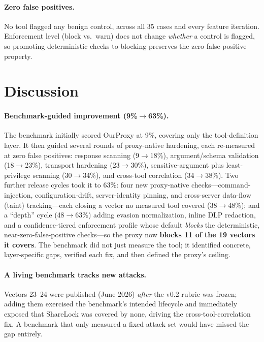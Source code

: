 \documentclass[sigconf,review,anonymous]{acmart}
\begin{document}
\paragraph{Zero false positives.} No tool flagged any benign control, across all 35 cases and every feature iteration. Enforcement level (block vs.\ warn) does not change \emph{whether} a control is flagged, so promoting deterministic checks to blocking preserves the zero-false-positive property.

\section{Discussion}\label{sec:discussion}
\paragraph{Benchmark-guided improvement (9\%$\rightarrow$63\%).} The benchmark initially scored OurProxy at 9\%, covering only the tool-definition layer. It then guided several rounds of proxy-native hardening, each re-measured at zero false positives: response scanning (9$\rightarrow$18\%), argument/schema validation (18$\rightarrow$23\%), transport hardening (23$\rightarrow$30\%), sensitive-argument plus least-privilege scanning (30$\rightarrow$34\%), and cross-tool correlation (34$\rightarrow$38\%). Two further release cycles took it to 63\%: four new proxy-native checks---command-injection, configuration-drift, server-identity pinning, and cross-server data-flow (taint) tracking---each closing a vector no measured tool covered (38$\rightarrow$48\%); and a ``depth'' cycle (48$\rightarrow$63\%) adding evasion normalization, inline DLP redaction, and a confidence-tiered enforcement profile whose default \emph{blocks} the deterministic, near-zero-false-positive checks---so the proxy now \textbf{blocks 11 of the 19 vectors it covers}. The benchmark did not just measure the tool; it identified concrete, layer-specific gaps, verified each fix, and then defined the proxy's ceiling.

\paragraph{A living benchmark tracks new attacks.} Vectors 23--24 were published (June 2026) \emph{after} the v0.2 rubric was frozen; adding them exercised the benchmark's intended lifecycle and immediately exposed that ShareLock was covered by none, driving the cross-tool-correlation fix. A benchmark that only measured a fixed attack set would have missed the gap entirely.
\end{document}
